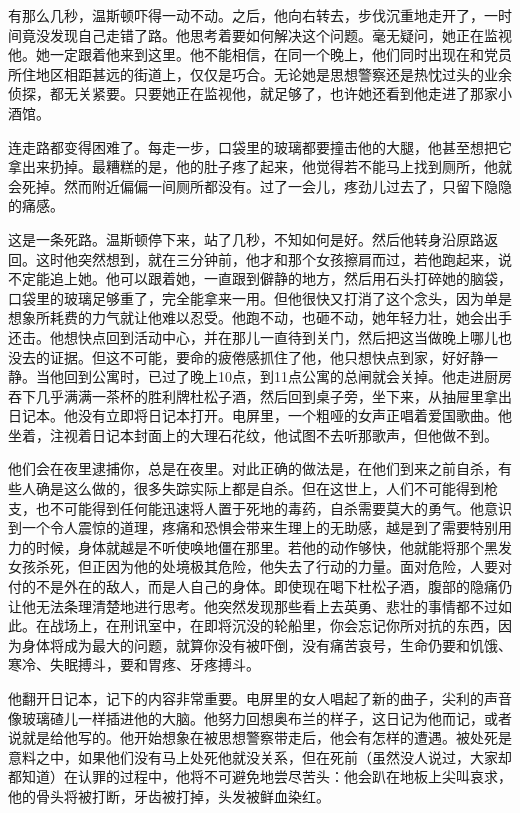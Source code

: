 有那么几秒，温斯顿吓得一动不动。之后，他向右转去，步伐沉重地走开了，一时间竟没发现自己走错了路。他思考着要如何解决这个问题。毫无疑问，她正在监视他。她一定跟着他来到这里。他不能相信，在同一个晚上，他们同时出现在和党员所住地区相距甚远的街道上，仅仅是巧合。无论她是思想警察还是热忱过头的业余侦探，都无关紧要。只要她正在监视他，就足够了，也许她还看到他走进了那家小酒馆。

连走路都变得困难了。每走一步，口袋里的玻璃都要撞击他的大腿，他甚至想把它拿出来扔掉。最糟糕的是，他的肚子疼了起来，他觉得若不能马上找到厕所，他就会死掉。然而附近偏偏一间厕所都没有。过了一会儿，疼劲儿过去了，只留下隐隐的痛感。

这是一条死路。温斯顿停下来，站了几秒，不知如何是好。然后他转身沿原路返回。这时他突然想到，就在三分钟前，他才和那个女孩擦肩而过，若他跑起来，说不定能追上她。他可以跟着她，一直跟到僻静的地方，然后用石头打碎她的脑袋，口袋里的玻璃足够重了，完全能拿来一用。但他很快又打消了这个念头，因为单是想象所耗费的力气就让他难以忍受。他跑不动，也砸不动，她年轻力壮，她会出手还击。他想快点回到活动中心，并在那儿一直待到关门，然后把这当做晚上哪儿也没去的证据。但这不可能，要命的疲倦感抓住了他，他只想快点到家，好好静一静。当他回到公寓时，已过了晚上10点，到11点公寓的总闸就会关掉。他走进厨房吞下几乎满满一茶杯的胜利牌杜松子酒，然后回到桌子旁，坐下来，从抽屉里拿出日记本。他没有立即将日记本打开。电屏里，一个粗哑的女声正唱着爱国歌曲。他坐着，注视着日记本封面上的大理石花纹，他试图不去听那歌声，但他做不到。

他们会在夜里逮捕你，总是在夜里。对此正确的做法是，在他们到来之前自杀，有些人确是这么做的，很多失踪实际上都是自杀。但在这世上，人们不可能得到枪支，也不可能得到任何能迅速将人置于死地的毒药，自杀需要莫大的勇气。他意识到一个令人震惊的道理，疼痛和恐惧会带来生理上的无助感，越是到了需要特别用力的时候，身体就越是不听使唤地僵在那里。若他的动作够快，他就能将那个黑发女孩杀死，但正因为他的处境极其危险，他失去了行动的力量。面对危险，人要对付的不是外在的敌人，而是人自己的身体。即使现在喝下杜松子酒，腹部的隐痛仍让他无法条理清楚地进行思考。他突然发现那些看上去英勇、悲壮的事情都不过如此。在战场上，在刑讯室中，在即将沉没的轮船里，你会忘记你所对抗的东西，因为身体将成为最大的问题，就算你没有被吓倒，没有痛苦哀号，生命仍要和饥饿、寒冷、失眠搏斗，要和胃疼、牙疼搏斗。

他翻开日记本，记下的内容非常重要。电屏里的女人唱起了新的曲子，尖利的声音像玻璃碴儿一样插进他的大脑。他努力回想奥布兰的样子，这日记为他而记，或者说就是给他写的。他开始想象在被思想警察带走后，他会有怎样的遭遇。被处死是意料之中，如果他们没有马上处死他就没关系，但在死前（虽然没人说过，大家却都知道）在认罪的过程中，他将不可避免地尝尽苦头：他会趴在地板上尖叫哀求，他的骨头将被打断，牙齿被打掉，头发被鲜血染红。

